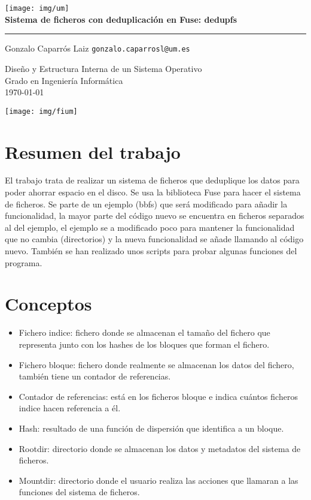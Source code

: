 \documentclass[a4paper,12pt]{article}
\begin{document}
\begin{titlepage}
\centering
\texttt{[image: img/um]}
\\
\vspace{2cm}
{\huge \textbf{Sistema de ficheros con deduplicación en Fuse: dedupfs}}
\\
\noindent\rule{10cm}{0.4pt}

Gonzalo Caparrós Laiz \texttt{gonzalo.caparrosl@um.es}

\vspace{2cm}

{\large Diseño y Estructura Interna de un Sistema Operativo}
\\
Grado en Ingeniería Informática
\vspace{1cm}
\\
\today


\vfill
\texttt{[image: img/fium]}

\end{titlepage}

\tableofcontents

\newpage
\section{Resumen del trabajo}

El trabajo trata de realizar un sistema de ficheros que deduplique los datos para poder ahorrar espacio en el disco. Se usa la biblioteca Fuse para hacer el sistema de ficheros. Se parte de un ejemplo (bbfs) que será modificado para añadir la funcionalidad, la mayor parte del código nuevo se encuentra en ficheros separados al del ejemplo, el ejemplo se a modificado poco para mantener la funcionalidad que no cambia (directorios) y la nueva funcionalidad se añade llamando al código nuevo. También se han realizado unos scripts para probar algunas funciones del programa.

\section{Conceptos}

\begin{itemize}
\item Fichero indice: fichero donde se almacenan el tamaño del fichero que representa junto con los hashes de los bloques que forman el fichero.
\item Fichero bloque: fichero donde realmente se almacenan los datos del fichero, también tiene un contador de referencias.
\item Contador de referencias: está en los ficheros bloque e indica cuántos ficheros indice hacen referencia a él.
\item Hash: resultado de una función de dispersión que identifica a un bloque.
\item Rootdir: directorio donde se almacenan los datos y metadatos del sistema de ficheros.
\item Mountdir: directorio donde el usuario realiza las acciones que llamaran a las funciones del sistema de ficheros.
\end{itemize}
\end{document}
